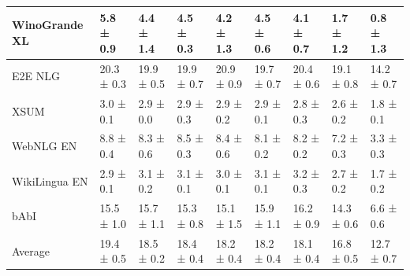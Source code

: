 \documentclass{article}
\begin{document}
\begin{table}[htbp]
{\begin{tabular}{l|llllllll}
WinoGrande XL & 5.8 ± 0.9 & 4.4 ± 1.4 & 4.5 ± 0.3 & 4.2 ± 1.3 & 4.5 ± 0.6 & 4.1 ± 0.7 & 1.7 ± 1.2 & 0.8 ± 1.3 \\
\midrule
E2E NLG & 20.3 ± 0.3 & 19.9 ± 0.5 & 19.9 ± 0.7 & 20.9 ± 0.9 & 19.7 ± 0.7 & 20.4 ± 0.6 & 19.1 ± 0.8 & 14.2 ± 0.7 \\
XSUM & 3.0 ± 0.1 & 2.9 ± 0.0 & 2.9 ± 0.3 & 2.9 ± 0.2 & 2.9 ± 0.1 & 2.8 ± 0.3 & 2.6 ± 0.2 & 1.8 ± 0.1 \\
WebNLG EN & 8.8 ± 0.4 & 8.3 ± 0.6 & 8.5 ± 0.3 & 8.4 ± 0.6 & 8.1 ± 0.2 & 8.2 ± 0.2 & 7.2 ± 0.3 & 3.3 ± 0.3 \\
WikiLingua EN & 2.9 ± 0.1 & 3.1 ± 0.2 & 3.1 ± 0.1 & 3.0 ± 0.1 & 3.1 ± 0.1 & 3.2 ± 0.3 & 2.7 ± 0.2 & 1.7 ± 0.2 \\
\midrule
bAbI & 15.5 ± 1.0 & 15.7 ± 1.1 & 15.3 ± 0.8 & 15.1 ± 1.5 & 15.9 ± 1.1 & 16.2 ± 0.9 & 14.3 ± 0.6 & 6.6 ± 0.6 \\
\midrule
Average & 19.4 ± 0.5 & 18.5 ± 0.2 & 18.4 ± 0.4 & 18.2 ± 0.4 & 18.2 ± 0.4 & 18.1 ± 0.4 & 16.8 ± 0.5 & 12.7 ± 0.7 \\
\bottomrule
  \end{tabular}
  }
  \label{tab:2b8oscarrep}
\end{table}
\end{document}
